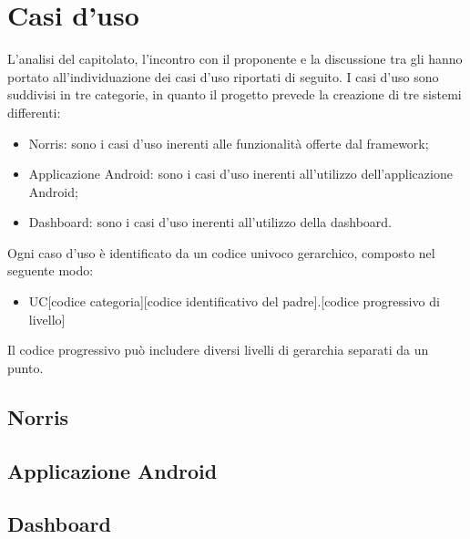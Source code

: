 \section{Casi d'uso}
L’analisi del capitolato, l’incontro con il proponente e la discussione tra gli  hanno portato all'individuazione dei casi d'uso riportati di seguito. 
I casi d'uso sono suddivisi in tre categorie, in quanto il progetto prevede la creazione di tre sistemi differenti:
\begin{itemize}
	\item Norris: sono i casi d'uso inerenti alle funzionalità offerte dal framework;
	\item Applicazione Android: sono i casi d'uso inerenti all'utilizzo dell'applicazione Android;
	\item Dashboard: sono i casi d'uso inerenti all'utilizzo della dashboard.
\end{itemize}
Ogni caso d'uso è identificato da un codice univoco gerarchico, composto nel seguente modo:
\begin{itemize}
	\item [] UC[codice categoria][codice identificativo del padre].[codice progressivo di livello]
\end{itemize}
Il codice progressivo può includere diversi livelli di gerarchia separati da un punto.

\subsection{Norris}


\subsection{Applicazione Android}


\subsection{Dashboard}


